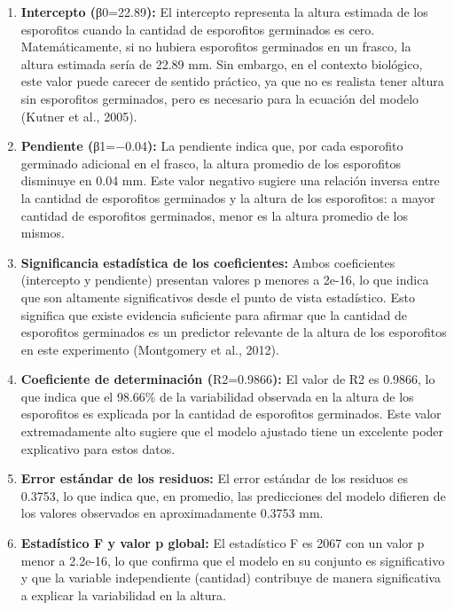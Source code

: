 \documentclass[
  spanish,
  a4paper,
  DIV=11,
  numbers=noendperiod,
  onepage,
  openany]{scrreprt}
\begin{document}
\begin{enumerate}
\def\labelenumi{\arabic{enumi}.}
\item
  \textbf{Intercepto (}β0=22.89\textbf{):} El intercepto representa la
  altura estimada de los esporofitos cuando la cantidad de esporofitos
  germinados es cero. Matemáticamente, si no hubiera esporofitos
  germinados en un frasco, la altura estimada sería de 22.89 mm. Sin
  embargo, en el contexto biológico, este valor puede carecer de sentido
  práctico, ya que no es realista tener altura sin esporofitos
  germinados, pero es necesario para la ecuación del modelo (Kutner et
  al., 2005).
\item
  \textbf{Pendiente (}β1=−0.04\textbf{):} La pendiente indica que, por
  cada esporofito germinado adicional en el frasco, la altura promedio
  de los esporofitos disminuye en 0.04 mm. Este valor negativo sugiere
  una relación inversa entre la cantidad de esporofitos germinados y la
  altura de los esporofitos: a mayor cantidad de esporofitos germinados,
  menor es la altura promedio de los mismos.
\item
  \textbf{Significancia estadística de los coeficientes:} Ambos
  coeficientes (intercepto y pendiente) presentan valores p menores a
  2e-16, lo que indica que son altamente significativos desde el punto
  de vista estadístico. Esto significa que existe evidencia suficiente
  para afirmar que la cantidad de esporofitos germinados es un predictor
  relevante de la altura de los esporofitos en este experimento
  (Montgomery et al., 2012).
\item
  \textbf{Coeficiente de determinación (}R2=0.9866\textbf{):} El valor
  de R2 es 0.9866, lo que indica que el 98.66\% de la variabilidad
  observada en la altura de los esporofitos es explicada por la cantidad
  de esporofitos germinados. Este valor extremadamente alto sugiere que
  el modelo ajustado tiene un excelente poder explicativo para estos
  datos.
\item
  \textbf{Error estándar de los residuos:} El error estándar de los
  residuos es 0.3753, lo que indica que, en promedio, las predicciones
  del modelo difieren de los valores observados en aproximadamente
  0.3753 mm.
\item
  \textbf{Estadístico F y valor p global:} El estadístico F es 2067 con
  un valor p menor a 2.2e-16, lo que confirma que el modelo en su
  conjunto es significativo y que la variable independiente (cantidad)
  contribuye de manera significativa a explicar la variabilidad en la
  altura.
\end{enumerate}
\end{document}
